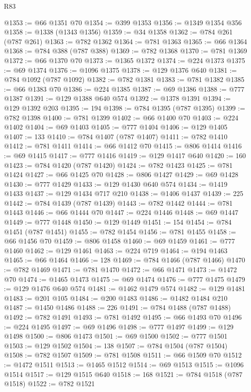 \begin{lexlean}{R83}
\begin{coremodule}
@1353 := @66 @1351 @70
@1354 := @399 @1353
@1356 := @1349 @1354 @356
@1358 := @1338 (@1343 @1356)
@1359 := @34 @1358
@1362 := @784 @261 (@787 @261)
@1363 := @782 @1362
@1364 := @781 @1363
@1365 := @66 @1364
@1368 := @784 @388 (@787 @388)
@1369 := @782 @1368
@1370 := @781 @1369
@1372 := @66 @1370 @70
@1373 := @1365 @1372
@1374 := @224 @1373
@1375 := @69 @1374
@1376 := @1096 @1375
@1378 := @129 @1376 @640
@1381 := @784 @1092 (@787 @1092)
@1382 := @782 @1381
@1383 := @781 @1382
@1385 := @66 @1383 @70
@1386 := @224 @1385
@1387 := @69 @1386
@1388 := @777 @1387
@1391 := @129 @1388 @640 @574
@1392 := @1378 @1391
@1394 := @129 @1392 @203
@1395 := 194
@1398 := @784 @1395 (@787 @1395)
@1399 := @782 @1398
@1400 := @781 @1399
@1402 := @66 @1400 @70
@1403 := @224 @1402
@1404 := @69 @1403
@1405 := @777 @1404
@1406 := @129 @1405
@1407 := 133
@1410 := @784 @1407 (@787 @1407)
@1411 := @782 @1410
@1412 := @781 @1411
@1414 := @66 @1412 @70
@1415 := @806 @1414
@1416 := @69 @1415
@1417 := @777 @1416
@1419 := @129 @1417 @640
@1420 := 160
@1423 := @784 @1420 (@787 @1420)
@1424 := @782 @1423
@1425 := @781 @1424
@1427 := @66 @1425 @70
@1428 := @806 @1427
@1429 := @69 @1428
@1430 := @777 @1429
@1433 := @129 @1430 @640 @574
@1434 := @1419 @1433
@1437 := @129 @1434 @717 @210
@1438 := @1406 @1437
@1439 := 225
@1442 := @784 @1439 (@787 @1439)
@1443 := @782 @1442
@1444 := @781 @1443
@1446 := @66 @1444 @70
@1447 := @224 @1446
@1448 := @69 @1447
@1449 := @777 @1448
@1450 := @129 @1449
@1451 := 154
@1454 := @784 @1451 (@787 @1451)
@1455 := @782 @1454
@1456 := @781 @1455
@1458 := @66 @1456 @70
@1459 := @806 @1458
@1460 := @69 @1459
@1461 := @777 @1460
@1462 := @129 @1461
@1463 := @224 @719
@1464 := @194 @1463
@1465 := @66 @1464
@1466 := 128
@1469 := @784 @1466 (@787 @1466)
@1470 := @782 @1469
@1471 := @781 @1470
@1472 := @66 @1471
@1473 := @1472 @70
@1474 := @1465 @1473
@1475 := @69 @1474
@1476 := @777 @1475
@1479 := @129 @1476 @640 @574
@1481 := @1462 @1479 @574
@1482 := @129 @1481
@1483 := @201 @105
@1484 := @200 @1483
@1486 := @1482 @1484 @210
@1487 := @1450 @1486
@1488 := 226
@1491 := @784 @1488 (@787 @1488)
@1492 := @782 @1491
@1493 := @781 @1492
@1495 := @66 @1493 @70
@1496 := @224 @1495
@1497 := @69 @1496
@1498 := @777 @1497
@1499 := @129 @1498
@1500 := @806 @1473
@1501 := @69 @1500
@1502 := @777 @1501
@1503 := @129 @1502
@1504 := 138
@1507 := @784 @1504 (@787 @1504)
@1508 := @782 @1507
@1509 := @781 @1508
@1511 := @66 @1509 @70
@1512 := @1472 @1511
@1513 := @1465 @1512
@1514 := @69 @1513
@1515 := @1096 @1514
@1517 := @129 @1515 @640
@1518 := 168
@1521 := @784 @1518 (@787 @1518)
@1522 := @782 @1521

\end{coremodule}
\end{lexlean}
